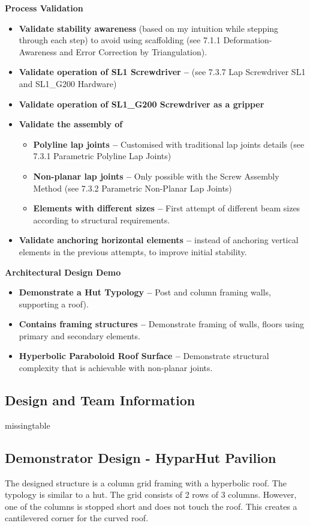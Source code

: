 \textbf{Process Validation}
\begin{itemize}
    \item \textbf{Validate stability awareness} (based on my intuition while stepping through each step) to avoid using scaffolding (see 7.1.1 Deformation-Awareness and Error Correction by Triangulation).
    \item \textbf{Validate operation of SL1 Screwdriver --} (see 7.3.7 Lap Screwdriver SL1 and SL1\_G200 Hardware)
    \item \textbf{Validate operation of SL1\_G200 Screwdriver as a gripper}
    \item \textbf{Validate the assembly of}
    \begin{itemize}
        \item \textbf{Polyline lap joints --} Customised with traditional lap joints details (see 7.3.1 Parametric Polyline Lap Joints)
        \item \textbf{Non-planar lap joints --} Only possible with the Screw Assembly Method (see 7.3.2 Parametric Non-Planar Lap Joints)
        \item \textbf{Elements with different sizes --} First attempt of different beam sizes according to structural requirements.
    \end{itemize}
    \item \textbf{Validate anchoring horizontal elements --} instead of anchoring vertical elements in the previous attempts, to improve initial stability.
\end{itemize}
\textbf{Architectural Design Demo}
\begin{itemize}
    \item \textbf{Demonstrate a Hut Typology --} Post and column framing walls, supporting a roof).
    \item \textbf{Contains framing structures --} Demonstrate framing of walls, floors using primary and secondary elements.
    \item \textbf{Hyperbolic Paraboloid Roof Surface --} Demonstrate structural complexity that is achievable with non-planar joints.
\end{itemize}

\subsection{Design and Team Information}
missingtable

\subsection{Demonstrator Design  - HyparHut Pavilion}
The designed structure is a column grid framing with a hyperbolic roof. The typology is similar to a hut. The grid consists of 2 rows of 3 columns. However, one of the columns is stopped short and does not touch the roof. This creates a cantilevered corner for the curved roof.

